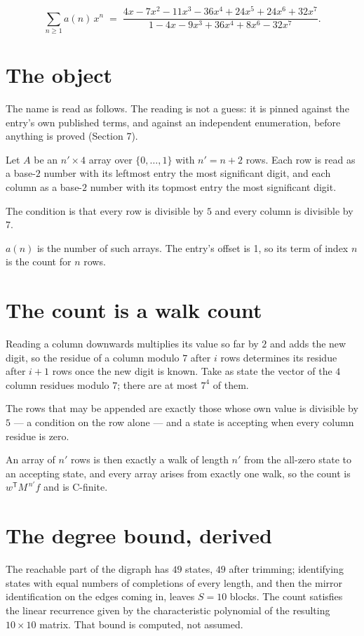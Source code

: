 \documentclass[11pt]{article}
\theoremstyle{definition}
\begin{document}
\[\sum_{n \ge 1} a(n)\,x^n \;=\; \frac{4x - 7x^{2} - 11x^{3} - 36x^{4} + 24x^{5} + 24x^{6} + 32x^{7}}{1 - 4x - 9x^{3} + 36x^{4} + 8x^{6} - 32x^{7}}.\]

\section{The object}

The name is read as follows. The reading is not a guess: it is pinned against the entry's own published terms, and against an independent enumeration, before anything is proved (Section 7).

Let $A$ be an $n' \times 4$ array over $\{0,\dots,1\}$ with $n' = n + 2$ rows. Each row is read as a base-$2$ number with its leftmost entry the most significant digit, and each column as a base-$2$ number with its topmost entry the most significant digit.

The condition is that every row is divisible by $5$ and every column is divisible by $7$.

$a(n)$ is the number of such arrays. The entry's offset is 1, so its term of index $n$ is the count for $n$ rows.

\section{The count is a walk count}

Reading a column downwards multiplies its value so far by $2$ and adds the new digit, so the residue of a column modulo $7$ after $i$ rows determines its residue after $i+1$ rows once the new digit is known. Take as state the vector of the $4$ column residues modulo $7$; there are at most $7^{4}$ of them.

The rows that may be appended are exactly those whose own value is divisible by $5$ --- a condition on the row alone --- and a state is accepting when every column residue is zero.

An array of $n'$ rows is then exactly a walk of length $n'$ from the all-zero state to an accepting state, and every array arises from exactly one walk, so the count is $w^{\mathsf T}M^{\,n'}f$ and is C-finite.

\section{The degree bound, derived}

The reachable part of the digraph has $49$ states, $49$ after trimming; identifying states with equal numbers of completions of every length, and then the mirror identification on the edges coming in, leaves $S = 10$ blocks. The count satisfies the linear recurrence given by the characteristic polynomial of the resulting $10\times10$ matrix. That bound is computed, not assumed.
\end{document}
